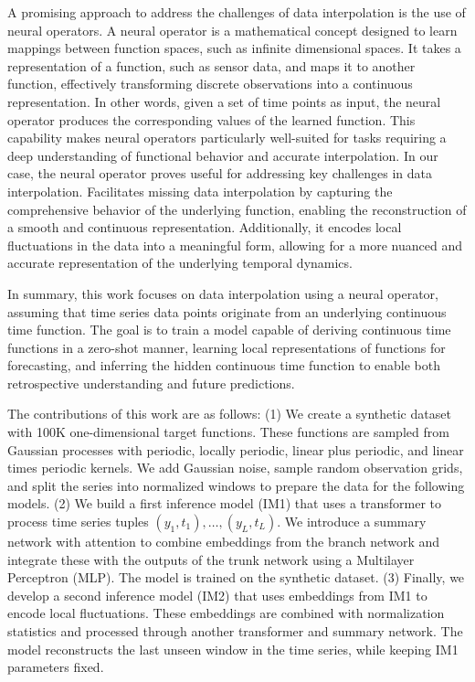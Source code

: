 \documentclass{article}
\theoremstyle{plain}
\theoremstyle{definition}
\theoremstyle{remark}
\begin{document}
A promising approach to address the challenges of data interpolation is the use of neural operators. A neural operator is a mathematical concept designed to learn mappings between function spaces, such as infinite dimensional spaces. It takes a representation of a function, such as sensor data, and maps it to another function, effectively transforming discrete observations into a continuous representation. In other words, given a set of time points as input, the neural operator produces the corresponding values of the learned function. This capability makes neural operators particularly well-suited for tasks requiring a deep understanding of functional behavior and accurate interpolation.
In our case, the neural operator proves useful for addressing key challenges in data interpolation. Facilitates missing data interpolation by capturing the comprehensive behavior of the underlying function, enabling the reconstruction of a smooth and continuous representation. Additionally, it encodes local fluctuations in the data into a meaningful form, allowing for a more nuanced and accurate representation of the underlying temporal dynamics.

In summary, this work focuses on data interpolation using a neural operator, assuming that time series data points originate from an underlying continuous time function. The goal is to train a model capable of deriving continuous time functions in a zero-shot manner, learning local representations of functions for forecasting, and inferring the hidden continuous time function to enable both retrospective understanding and future predictions.

The contributions of this work are as follows: (1) We create a synthetic dataset with 100K one-dimensional target functions. These functions are sampled from Gaussian processes with periodic, locally periodic, linear plus periodic, and linear times periodic kernels. We add Gaussian noise, sample random observation grids, and split the series into normalized windows to prepare the data for the following models. (2) We build a first inference model (IM1) that uses a transformer to process time series tuples $(y_1, t_1), \dots, (y_L, t_L)$. We introduce a summary network with attention to combine embeddings from the branch network and integrate these with the outputs of the trunk network using a Multilayer Perceptron (MLP). The model is trained on the synthetic dataset. (3) Finally, we develop a second inference model (IM2) that uses embeddings from IM1 to encode local fluctuations. These embeddings are combined with normalization statistics and processed through another transformer and summary network. The model reconstructs the last unseen window in the time series, while keeping IM1 parameters fixed.
\end{document}

